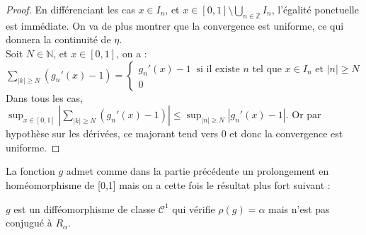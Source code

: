 \documentclass[11pt,a4paper]{article}
\begin{document}
\begin{proof}
%
%
En différenciant les cas $x \in I_n$, et $\displaystyle x\in [0,1] \setminus \bigcup_{n \in \mathbb{Z}} I_n$, l'égalité ponctuelle est immédiate. On va de plus montrer que la convergence est uniforme, ce qui donnera la continuité de $\eta$. \\ 
Soit $N \in \mathbb{N}$, et $x\in [0,1]$, on a : $\displaystyle \sum_{|k| \geq N} (g_n'(x)-1)= \begin{cases} g_n'(x)-1 \ \text{ si il existe } n \text{ tel que } x\in I_n \text{ et } |n|\geq N\\ 0 \end{cases}$ \\
Dans tous les cas, $\displaystyle \sup_{x\in [0,1]} \left | \sum_{|k| \geq N} (g_n'(x)-1) \right | \leq \sup_{|n| \geq N} |g_n'(x) -1|$. Or par hypothèse sur les dérivées, ce majorant tend vers $0$ et donc la convergence est uniforme. 
\end{proof}

La fonction $g$ admet comme dans la partie précédente un prolongement en homéomorphisme de [0,1] mais on a cette fois le résultat plus fort suivant :

\begin{thm}
$g$ est un difféomorphisme de classe $\mathcal{C}^1$ qui vérifie $\rho(g)=\alpha$ mais n'est pas conjugué à $R_\alpha$.
\end{thm}
\end{document}
